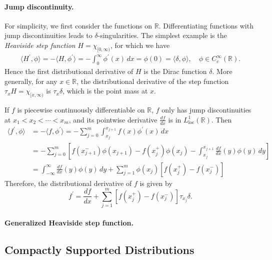 \documentclass{article}
\numberwithin{equation}{section}
\newcommand{\bbR}{\mathbb{R}}
\newcommand{\loc}{\mathrm{loc}}
\theoremstyle{plain}
\theoremstyle{definition}
\begin{document}
\paragraph{Jump discontinuity.} For simplicity, we first consider the functions on $\bbR$. Differentiating functions with jump discontinuities leads to $\delta$-singularities. The simplest example is the \textit{Heaviside step function} $H=\chi_{[0,\infty)}$, for which we have
\begin{align*}
	\langle H^\prime,\phi\rangle=-\langle H,\phi^\prime\rangle=-\int_0^\infty\phi^\prime(x)\,dx=\phi(0)=\langle\delta,\phi\rangle,\quad\phi\in C_c^\infty(\bbR).
\end{align*}
Hence the first distributional derivative of $H$ is the Dirac function $\delta$. More generally, for any $x\in\bbR$, the distributional derivative of the step function $\tau_x H=\chi_{[x,\infty)}$ is $\tau_x\delta$, which is the point mass at $x$.

If $f$ is piecewise continuously differentiable on $\bbR$, $f$ only has jump discontinuities at $x_1<x_2<\cdots<x_m$, and its pointwise derivative $\frac{df}{dx}$ is in $L^1_\loc(\bbR)$. Then
\begin{align*}
	\langle f^\prime,\phi\rangle&=-\langle f,\phi^\prime\rangle=-\sum_{j=0}^m\int_{x_j}^{x_{j+1}}f(x)\phi^\prime(x)\,dx\\
	&=-\sum_{j=0}^m\left[f(x_{j+1}^-)\phi(x_{j+1})-f(x_j^+)\phi(x_j)-\int_{x_j}^{x_{j+1}}\frac{df}{dx}(y)\phi(y)\,dy\right]\\
	&=\int_{-\infty}^\infty\frac{df}{dx}(y)\phi(y)\,dy+\sum_{j=1}^m\phi(x_j)\left[f(x_j^+)-f(x_j^-)\right]
\end{align*}
Therefore, the distributional derivative of $f$ is given by $$f^\prime=\frac{df}{dx}+\sum_{j=1}^m\left[f(x_j^+)-f(x_j^-)\right]\tau_{x_j}\delta.$$

\paragraph{Generalized Heaviside step function.}

\newpage
\subsection{Compactly Supported Distributions}
\end{document}
